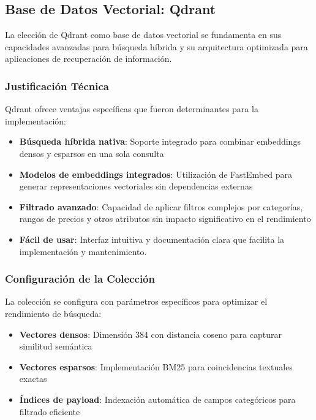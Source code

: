 \subsection{Base de Datos Vectorial: Qdrant}

La elección de Qdrant como base de datos vectorial se fundamenta en sus capacidades avanzadas para búsqueda híbrida y su arquitectura optimizada para aplicaciones de recuperación de información.

\subsubsection{Justificación Técnica}

Qdrant ofrece ventajas específicas que fueron determinantes para la implementación:

\begin{itemize}
    \item \textbf{Búsqueda híbrida nativa}: Soporte integrado para combinar embeddings densos y esparsos en una sola consulta
    \item \textbf{Modelos de embeddings integrados}: Utilización de FastEmbed para generar representaciones vectoriales sin dependencias externas
    \item \textbf{Filtrado avanzado}: Capacidad de aplicar filtros complejos por categorías, rangos de precios y otros atributos sin impacto significativo en el rendimiento
    \item \textbf{Fácil de usar}: Interfaz intuitiva y documentación clara que facilita la implementación y mantenimiento.
\end{itemize}

\subsubsection{Configuración de la Colección}

La colección se configura con parámetros específicos para optimizar el rendimiento de búsqueda:

\begin{itemize}
    \item \textbf{Vectores densos}: Dimensión 384 con distancia coseno para capturar similitud semántica
    \item \textbf{Vectores esparsos}: Implementación BM25 para coincidencias textuales exactas
    \item \textbf{Índices de payload}: Indexación automática de campos categóricos para filtrado eficiente
\end{itemize}

